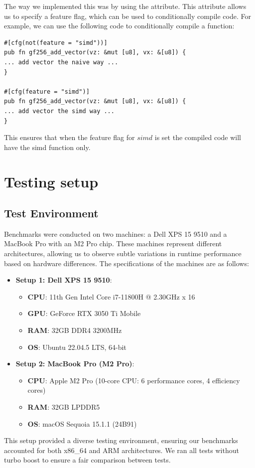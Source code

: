 \documentclass[11pt]{report}
\theoremstyle{definition}
\theoremstyle{plain}
\begin{document}
The way we implemented this was by using the  attribute. This attribute allows us to specify a feature flag, which can be used to conditionally compile code. For example, we can use the following code to conditionally compile a function:
\begin{verbatim}
#[cfg(not(feature = "simd"))]
pub fn gf256_add_vector(vz: &mut [u8], vx: &[u8]) {
... add vector the naive way ...
}

#[cfg(feature = "simd")]
pub fn gf256_add_vector(vz: &mut [u8], vx: &[u8]) {
... add vector the simd way ...
}
\end{verbatim}
This ensures that when the feature flag for $simd$ is set the compiled code will have the simd function only.

\section{Testing setup}\label{sub:testing_setup}

\subsection{Test Environment}\label{sub:test_env}
Benchmarks were conducted on two machines: a Dell XPS 15 9510 and a MacBook Pro with an M2 Pro chip. These machines represent different architectures, allowing us to observe subtle variations in runtime performance based on hardware differences. The specifications of the machines are as follows:

\begin{itemize}
  \item \textbf{Setup 1: Dell XPS 15 9510}:
        \begin{itemize}
          \item \textbf{CPU}: 11th Gen Intel Core i7-11800H @ 2.30GHz x 16
          \item \textbf{GPU}: GeForce RTX 3050 Ti Mobile
          \item \textbf{RAM}: 32GB DDR4 3200MHz
          \item \textbf{OS}: Ubuntu 22.04.5 LTS, 64-bit
        \end{itemize}
  \item \textbf{Setup 2: MacBook Pro (M2 Pro)}:
        \begin{itemize}
          \item \textbf{CPU}: Apple M2 Pro (10-core CPU: 6 performance cores, 4 efficiency cores)
          \item \textbf{RAM}: 32GB LPDDR5
          \item \textbf{OS}: macOS Sequoia 15.1.1 (24B91)
        \end{itemize}
\end{itemize}
This setup provided a diverse testing environment, ensuring our benchmarks accounted for both x86\_64 and ARM architectures. We ran all tests without turbo boost to ensure a fair comparison between tests.
\end{document}
